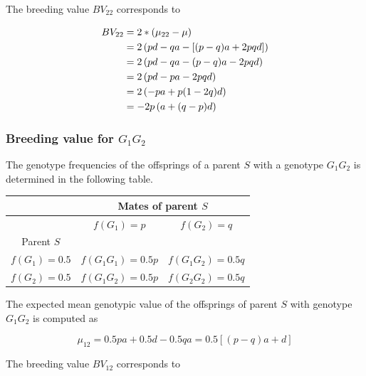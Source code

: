 \documentclass[]{book}
\theoremstyle{definition}
\theoremstyle{definition}
\theoremstyle{definition}
\theoremstyle{remark}
\begin{document}
The breeding value \(BV_{22}\) corresponds to

\begin{align}
BV_{22} &=   2*(\mu_{22} - \mu)  \notag \\
        &=   2\left(pd - qa - \left[(p - q)a + 2pqd \right] \right) \notag \\
        &=   2\left(pd - qa - (p - q)a - 2pqd \right) \notag \\
        &=   2\left(pd - pa - 2pqd\right) \notag \\
        &=   2\left(-pa + p(1-2q)d\right) \notag \\
        &=  -2p\left(a + (q - p)d\right)
\label{eq:BVGen22}
\end{align}

\hypertarget{breeding-value-for-g_1g_2}{%
\subsubsection{\texorpdfstring{Breeding value for \(G_1G_2\)}{Breeding value for G\_1G\_2}}\label{breeding-value-for-g_1g_2}}

The genotype frequencies of the offsprings of a parent \(S\) with a genotype \(G_1G_2\) is determined in the following table.

\vspace{5ex}

\begin{tabular}{|c|c|c|}
\hline
& \multicolumn{2}{|c|}{Mates of parent $S$} \\
\hline
& $f(G_1) = p$       &  $f(G_2) = q$   \\
\hline
Parent $S$       &                    &                 \\
\hline
$f(G_1) = 0.5$ &  $f(G_1G_1) = 0.5p$   &  $f(G_1G_2) = 0.5q$\\
\hline
$f(G_2) = 0.5$ &  $f(G_1G_2) = 0.5p$   &  $f(G_2G_2) = 0.5q$\\
\hline
\end{tabular}

\vspace{5ex}

The expected mean genotypic value of the offsprings of parent \(S\) with genotype \(G_1G_2\) is computed as

\begin{equation}
\mu_{12} = 0.5pa + 0.5d - 0.5qa = 0.5\left[(p-q)a + d \right]
\label{eq:MeanOffGen12}
\end{equation}

The breeding value \(BV_{12}\) corresponds to
\end{document}
